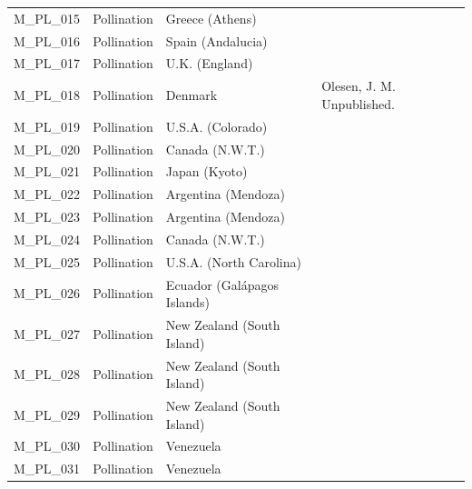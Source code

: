 \documentclass[12pt]{article}
\begin{document}
\begin{spacing}{1.5}
\begin{table}[!h]
\begin{center}
\begin{tabular}{|l l l m{7cm} |}
    M\_PL\_015  & Pollination & Greece (Athens) & \citet{Petanidou1991} \\
    M\_PL\_016  & Pollination & Spain (Andalucia) & \citet{Herrera1988} \\
    M\_PL\_017  & Pollination & U.K. (England) & \citet{Memmott2002} \\
    M\_PL\_018  & Pollination & Denmark & Olesen, J. M. Unpublished.  \\
    M\_PL\_019  & Pollination & U.S.A. (Colorado) & \citet{Inouye1988}  \\
    M\_PL\_020  & Pollination & Canada (N.W.T.) & \citet{Kevan1970} \\
    M\_PL\_021  & Pollination & Japan (Kyoto) & \citet{Kato1990}  \\
    M\_PL\_022  & Pollination & Argentina (Mendoza) & \citet{Medan2002} \\
    M\_PL\_023  & Pollination & Argentina (Mendoza) & \citet{Medan2002} \\
    M\_PL\_024  & Pollination & Canada (N.W.T.) & \citet{Mosquin1967} \\
    M\_PL\_025  & Pollination & U.S.A. (North Carolina) & \citet{Motten1982}  \\
    M\_PL\_026  & Pollination & Ecuador (Gal\'{a}pagos Islands) & \citet{McMullen1993}  \\
    M\_PL\_027  & Pollination & New Zealand (South Island) & \citet{Primack1983} \\
    M\_PL\_028  & Pollination & New Zealand (South Island) & \citet{Primack1983} \\
    M\_PL\_029  & Pollination & New Zealand (South Island) & \citet{Primack1983} \\
    M\_PL\_030  & Pollination & Venezuela & \citet{Ramirez1992} \\
    M\_PL\_031  & Pollination & Venezuela & \citet{Ramirez1989} \\
    \hline
    \end{tabular}
    \end{center}
    \end{table}

    \clearpage
    \newpage


\end{spacing}
\end{document}
